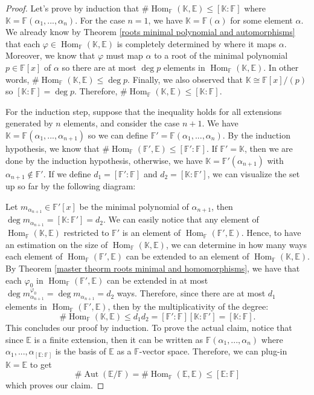 \documentclass{article}
\theoremstyle{plain}
\theoremstyle{definition}
\newcommand{\F}{\mathbb{F}}
\newcommand{\E}{\mathbb{E}}
\newcommand{\K}{\mathbb{K}}
\DeclareMathOperator{\Aut}{Aut}
\DeclareMathOperator{\Hom}{Hom}
\newcommand{\isomorphic}{\cong}
\begin{document}
\begin{proof}
    Let's prove by induction that $\# \Hom_{\F}(\K, \E) \leq [\K : \F]$ where $\K = \F(\alpha_1, ..., \alpha_n)$. For the case $n=1$, we have $\K = \F(\alpha)$ for some element $\alpha$. We already know by Theorem \ref{roots minimal polynomial and automorphisms} that each $\varphi \in \Hom_{\F}(\K, \E)$ is completely determined by where it maps $\alpha$. Moreover, we know that $\varphi$ must map $\alpha$ to a root of the minimal polynomial $p \in \F[x]$ of $\alpha$ so there are at most $\deg p$ elements in $\Hom_{\F}(\K, \E)$. In other words, $\#\Hom_{\F}(\K, \E) \leq \deg p$. Finally, we also observed that $\K \isomorphic \F[x] / (p)$ so $[\K : \F] = \deg p$. Therefore, $\# \Hom_{\F}(\K, \E) \leq [\K : \F]$. 
    
    For the induction step, suppose that the inequality holds for all extensions generated by $n$ elements, and consider the case $n+1$. We have $\K = \F(\alpha_1, ..., \alpha_{n+1})$ so we can define $\F' = \F(\alpha_1, ..., \alpha_n)$. By the induction hypothesis, we know that $\# \Hom_{\F}(\F', \E) \leq [\F' : \F]$. If $\F' = \K$, then we are done by the induction hypothesis, otherwise, we have $\K = \F'(\alpha_{n+1})$ with $\alpha_{n+1}\notin \F'$. If we define $d_1 = [\F' : \F]$ and $d_2 = [\K : \F']$, we can visualize the set up so far by the following diagram:
    \begin{center}
    \end{center}
    Let $m_{\alpha_{n+1}} \in \F'[x]$ be the minimal polynomial of $\alpha_{n+1}$, then $\deg m_{\alpha_{n+1}} = [\K : \F'] = d_2$. We can easily notice that any element of $\Hom_{\F}(\K, \E)$ restricted to $\F'$ is an element of $\Hom_{\F}(\F', \E)$. Hence, to have an estimation on the size of $\Hom_{\F}(\K, \E)$, we can determine in how many ways each element of $\Hom_{\F}(\F', \E)$ can be extended to an element of $\Hom_{\F}(\K, \E)$. By Theorem \ref{master theorm roots minimal and homomorphisms}, we have that each $\varphi_0$ in $\Hom_{\F}(\F', \E)$ can be extended in at most $\deg m_{\alpha_{n+1}}^{\varphi_0} = \deg m_{\alpha_{n+1}} = d_2$ ways. Therefore, since there are at most $d_1$ elements in $\Hom_{\F}(\F', \E)$, then by the multiplicativity of the degree:
    $$\#\Hom_{\F}(\K, \E) \leq d_1 d_2 = [\F': \F] [\K : \F'] = [\K : \F].$$
    This concludes our proof by induction. To prove the actual claim, notice that since $\E$ is a finite extension, then it can be written as $\F(\alpha_1, ..., \alpha_n)$ where $\alpha_1, ..., \alpha_{[\E : \F]}$ is the basis of $\E$ as a $\F$-vector space. Therefore, we can plug-in $\K = \E$ to get
    $$\# \Aut(\E / \F) = \# \Hom_{\F}(\E, \E) \leq [\E : \F]$$
    which proves our claim. 
\end{proof}
\end{document}
